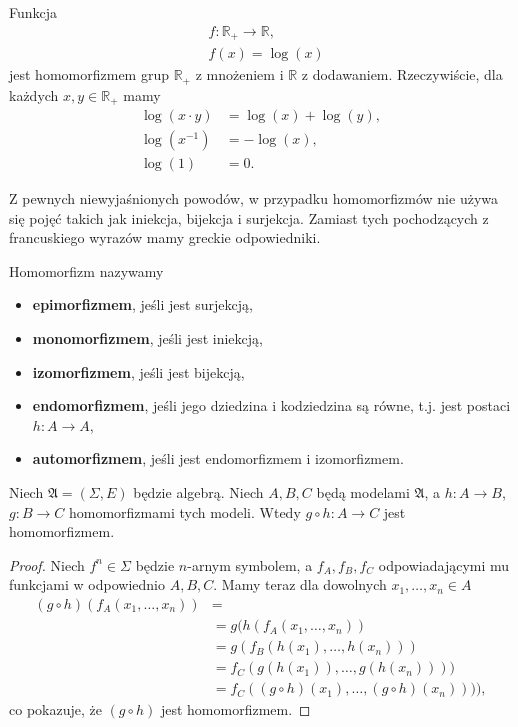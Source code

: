 \begin{example}
	Funkcja
	\begin{align*}
		&f: \mathbb{R}_+ \to \mathbb{R}, \\
		&f(x) = \log(x)
	\end{align*}
	jest homomorfizmem grup $\mathbb{R}_+$ z mnożeniem i $\mathbb{R}$ z dodawaniem.
	Rzeczywiście, dla każdych $x, y \in \mathbb{R}_+$ mamy
	\begin{align}
		\log(x \cdot y) &= \log(x) + \log(y), \\
		\log(x^{-1}) &= -\log(x), \\
		\log(1) &= 0.
	\end{align}
\end{example}

Z pewnych niewyjaśnionych powodów,
    w przypadku homomorfizmów nie używa się pojęć takich jak iniekcja, bijekcja i surjekcja.
Zamiast tych pochodzących z francuskiego wyrazów mamy greckie odpowiedniki.

\begin{definition}
    Homomorfizm nazywamy
    \begin{itemize}
        \item \textbf{epimorfizmem}, jeśli jest surjekcją,
        \item \textbf{monomorfizmem}, jeśli jest iniekcją,
        \item \textbf{izomorfizmem}, jeśli jest bijekcją,
        \item \textbf{endomorfizmem}, jeśli jego dziedzina i kodziedzina są równe, t.j. jest postaci $h:A \to A$,
        \item \textbf{automorfizmem}, jeśli jest endomorfizmem i izomorfizmem.
    \end{itemize}
\end{definition}

\begin{lemma}
	Niech $\mathfrak{A} = (\Sigma, E)$ będzie algebrą.
	Niech $A, B, C$ będą modelami $\mathfrak{A}$,
		a $h: A \to B$, $g: B \to C$ homomorfizmami tych modeli.
	Wtedy $g \circ h: A \to C$ jest homomorfizmem.
\end{lemma}
\begin{proof}
	Niech $f^n \in \Sigma$ będzie $n$-arnym symbolem,
		a $f_A, f_B, f_C$ odpowiadającymi mu funkcjami w odpowiednio $A, B, C$.
	Mamy teraz dla dowolnych $x_1, \dots, x_n \in A$
	\begin{align}
		(g \circ h)(f_A(x_1, \dots, x_n)) &= \\
			&= g(h(f_A(x_1, \dots, x_n)) \\
			&= g(f_B(h(x_1), \dots, h(x_n))) \\
			&= f_C(g(h(x_1)), \dots, g(h(x_n)))) \\
			&= f_C((g \circ h)(x_1), \dots, (g \circ h)(x_n)))),
\end{align}
	co pokazuje, że $(g \circ h)$ jest homomorfizmem.
\end{proof}

